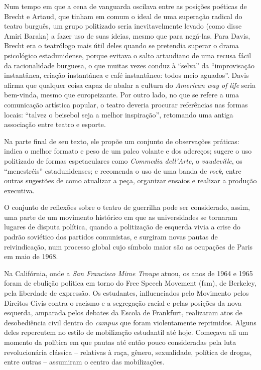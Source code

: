 Num tempo em que a cena de vanguarda oscilava entre as posições poéticas
de Brecht e Artaud, que tinham em comum o ideal de uma superação radical
do teatro burguês, um grupo politizado seria inevitavelmente levado
(como disse Amiri Baraka) a fazer uso de suas ideias, mesmo que para
negá-las. Para Davis, Brecht era o teatrólogo mais útil deles quando se
pretendia superar o drama psicológico estadunidense, porque evitava o
salto artaudiano de uma recusa fácil da racionalidade burguesa, o que
muitas vezes conduz à “selva” da “improvisação instantânea, criação
instantânea e café instantâneo: todos meio aguados”. Davis afirma que
qualquer coisa capaz de abalar a cultura do {\it American way of life}
seria bem-vinda, mesmo que europeizante. Por outro lado, no que se refere
a uma comunicação artística popular, o teatro deveria procurar
referências nas formas locais: “talvez o beisebol seja a melhor
inspiração”, retomando uma antiga associação entre teatro e esporte.

Na parte final de seu texto, ele propõe um conjunto de observações
práticas: indica o melhor formato e peso de um palco volante e dos
adereços; sugere o uso politizado de formas espetaculares como
{\it Commedia dell'Arte}, o {\it vaudeville}, os “menestréis”
estadunidenses; e recomenda o uso de uma banda de {\it rock}, entre
outras sugestões de como atualizar a peça, organizar ensaios e
realizar a produção executiva.

O conjunto de reflexões sobre o teatro de guerrilha pode ser
considerado, assim, uma parte de um movimento histórico em que as
universidades se tornaram lugares de disputa política, quando a
politização de esquerda vivia a crise do padrão soviético dos partidos
comunistas, e surgiram novas pautas de reivindicação, num processo
global cujo símbolo maior são as ocupações de Paris em maio de 1968.

Na Califórnia, onde a {\it San Francisco Mime Troupe} atuou, os anos de
1964 e 1965 foram de ebulição política em torno do Free Speech
Movement ({\sc fsm}), de Berkeley, pela liberdade de expressão. Os estudantes,
influenciados pelo Movimento pelos Direitos Civis contra o racismo e a
segregação racial e pelas posições da nova esquerda, amparada pelos
debates da Escola de Frankfurt, realizaram atos de desobediência civil
dentro do {\it campus} que foram violentamente reprimidos. Alguns deles
repercutem no estilo de mobilização estudantil até hoje. Começava ali um
momento da política em que pautas até então pouco consideradas pela luta
revolucionária clássica -- relativas à raça, gênero, sexualidade,
política de drogas, entre outras -- assumiram o centro das mobilizações.

